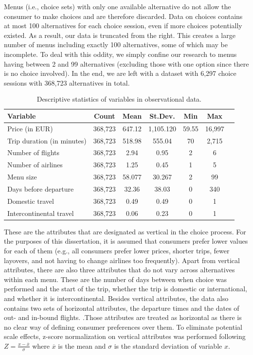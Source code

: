 \documentclass[a4paper,12pt]{article}
\begin{document}
Menus (i.e., choice sets) with only one available alternative do not allow the consumer to make choices and are therefore discarded. Data on choices contains at most 100 alternatives for each choice session, even if more choices potentially existed. As a result, our data is truncated from the right. This creates a large number of menus including exactly 100 alternatives, some of which may be incomplete. To deal with this oddity, we simply confine our research to menus having between 2 and 99 alternatives (excluding those with one option since there is no choice involved).  In the end, we are left with a dataset with  6,297 choice sessions with 368,723 alternatives in total.


\begin{table}
    \centering
    
    \begin{tabular}{l|cccccc}
    \hline
    Variable & Count & Mean & St.Dev. & Min & Max \\
    \hline
    Price (in EUR) & 368,723 & 647.12 & 1,105.120 & 59.55 & 16,997 \\
    Trip duration (in minutes) & 368,723 & 518.98 & 555.04 & 70 & 2,715 \\
    Number of flights & 368,723 & 2.94 & 0.95 & 2 & 6 \\
    Number of airlines & 368,723 & 1.25 & 0.45 & 1 & 5 \\
    Menu size & 368,723 & 58.077 & 30.267 & 2 & 99 \\
    Days before departure & 368,723 & 32.36 & 38.03 & 0 & 340\\
    Domestic travel & 368,723 & 0.49 & 0.49 & 0 & 1\\
    Intercontinental travel & 368,723 & 0.06 & 0.23 & 0 & 1\\
    \hline
    \end{tabular}
    \caption{Descriptive statistics of variables in observational data.}
    \label{tab:descriptiveStats}
\end{table}

These are the attributes that are designated as vertical in the choice process. For the purposes of this dissertation, it is  assumed that consumers prefer lower values for each of them (e.g., all consumers prefer lower prices, shorter trips, fewer layovers, and not having to change airlines too frequently). Apart from  vertical attributes, there are also three attributes that do not vary across alternatives within each menu. These are the number of days between when choice was performed and the start of the trip, whether the trip is
domestic or international, and whether it is intercontinental. Besides vertical attributes, the data also contains two sets of horizontal attributes, the departure times and the dates of out- and in-bound flights. .Those attributes are treated as horizontal as there is no clear way of defining consumer preferences over them. To eliminate potential scale effects, z-score normalization on vertical attributes was performed following  $Z = \frac{{x - \overline{x}}}{{\sigma}}
$ where $\overline{x}$ is the mean and $\sigma$ is the standard deviation of variable $x$. 
\end{document}
